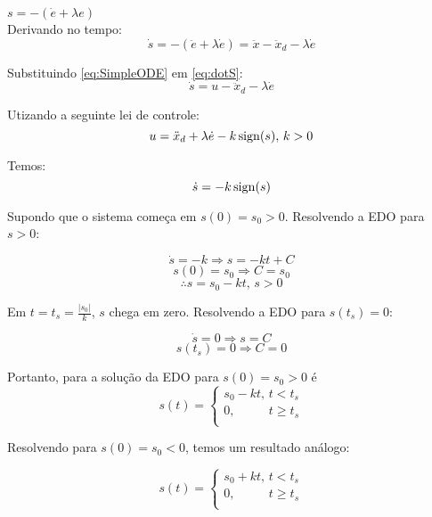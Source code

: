 $ s = -(\dot{e} + \lambda e) $ \\

Derivando no tempo:
\begin{equation} \label{eq:dotS}
\dot{s} =  -(\ddot{e} + \lambda \dot{e}) = \ddot{x} - \ddot{x}_d - \lambda \dot{e} 
\end{equation}

Substituindo \eqref{eq:SimpleODE} em \eqref{eq:dotS}:
\begin{equation} \label{dotS2}
\dot{s} = u - \ddot{x}_d - \lambda \dot{e}
\end{equation}

Utizando a seguinte lei de controle:
\begin{equation} \label{SMControlLaw1D}
u = \ddot{x}_d + \lambda \dot{e} - k \operatorname*{sign} (s), \, k>0
\end{equation}

Temos:
\begin{equation} \label{CloserLoop1D}
\dot{s} = -k \operatorname*{sign}(s) 
\end{equation}

Supondo que o sistema come\c{c}a em $s(0) = s_0 >0$. Resolvendo a EDO para $s>0$:

$$ \dot{s} = -k \Rightarrow s = -k t + C $$
$$ s(0) = s_0 \Rightarrow C = s_0 $$
$$ \therefore s = s_0 - k t, \, s>0 $$

Em $t = t_s = \frac{|s_0|}{k}$, $s$ chega em zero. Resolvendo a EDO para $s(t_s) = 0$:

$$ \dot{s} = 0 \Rightarrow s =  C $$
$$ s(t_s) = 0 \Rightarrow C = 0 $$

Portanto, para a solu\c{c}\~ao da EDO para $s(0) = s_0 > 0$ é
\begin{equation} \label{eq:SM-ODE-Sol1}
s(t) =
\begin{cases}
s_0 - k t, \, t < t_s \\
0, \,\,\,\,\,\,\,\,\,\,\,\,\,\,\,\, t \geq t_s \\
\end{cases}
\end{equation}

Resolvendo para $s(0) = s_0 < 0$, temos um resultado an\'alogo:

\begin{equation} \label{eq:SM-ODE-Sol2}
s(t) =
\begin{cases}
s_0 + k t, \, t < t_s \\
0, \,\,\,\,\,\,\,\,\,\,\,\,\,\,\,\, t \geq t_s \\
\end{cases}
\end{equation}

